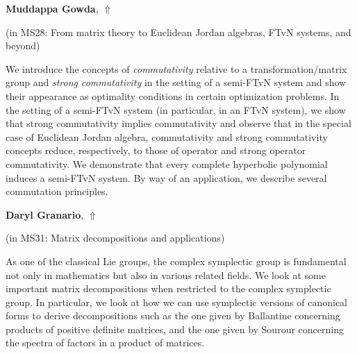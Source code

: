 \documentclass[ILAS2025-program.tex]{subfiles}
\begin{document}
\hypertarget{down0384}{}\begin{ilasabstract}
    
\textbf{Muddappa Gowda},  \hfill \hyperlink{up0384}{$\Uparrow$}
    
    
(in {\color{mstitle}MS28: From matrix theory to Euclidean Jordan algebras, FTvN systems, and beyond})
        
\mtskip
    We introduce the concepts of {\it commutativity} relative to a transformation/matrix group and {\it strong commutativity} in the setting of a semi-FTvN system and show their appearance as optimality conditions in certain optimization problems. In the setting of a semi-FTvN system (in particular, in an FTvN system), we show that strong commutativity implies commutativity and observe that in the special case of Euclidean Jordan algebra, commutativity and strong commutativity concepts reduce, respectively, to those of operator and strong operator commutativity. We demonstrate that every complete hyperbolic polynomial induces a semi-FTvN system. By way of an application, we describe several commutation principles. 


\end{ilasabstract}
    

\hypertarget{down0310}{}\begin{ilasabstract}
    
\textbf{Daryl Granario},  \hfill \hyperlink{up0310}{$\Uparrow$}
    
    
(in {\color{mstitle}MS31: Matrix decompositions and applications})
        
\mtskip
    As one of the classical Lie groups, the complex symplectic group is fundamental not only in mathematics but also in various related fields. We look at some important matrix decompositions when restricted to the complex symplectic group. In particular, we look at how we can use symplectic versions of canonical forms to derive decompositions such as the one given by Ballantine concerning products of positive definite matrices, and the one given by Sourour concerning the spectra of factors in a product of matrices.

\end{ilasabstract}
    
\end{document}
